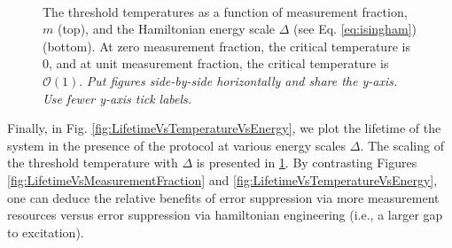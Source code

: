 \documentclass[twocolumn,superscriptaddress,aps,prb,floatfix]{revtex4-1}
\newcommand{\CMH}[1]{{\color{green} { #1}}}
\begin{document}
\begin{figure}
\begin{center}
\\
\vspace{-1.2\baselineskip}
\end{center}
\caption[justification=raggedright]{The threshold temperatures as a function of measurement fraction, $m$ (top),  and the Hamiltonian energy scale $\Delta$ (see Eq. \ref{eq:isingham})(bottom).  At zero measurement fraction, the critical temperature is 0, and at unit measurement fraction, the critical temperature is $\mathcal{O}(1)$. \CMH{\it{Put figures side-by-side horizontally and share the y-axis. Use fewer y-axis tick labels.}}}
\label{fig:CriticalTempVsMeasurementFraction}
\end{figure}



Finally, in Fig. \ref{fig:LifetimeVsTemperatureVsEnergy}, we plot the lifetime of the system in the presence of the protocol at various energy scales $\Delta$. \CMH{The scaling of the threshold temperature with $\Delta$ is presented in  \ref{fig:CriticalTempVsMeasurementFraction}}. By contrasting Figures \ref{fig:LifetimeVsMeasurementFraction} and \ref{fig:LifetimeVsTemperatureVsEnergy}, one can deduce the relative benefits of error suppression via more measurement resources versus error suppression via hamiltonian engineering (i.e., a larger gap to excitation). 
\end{document}
